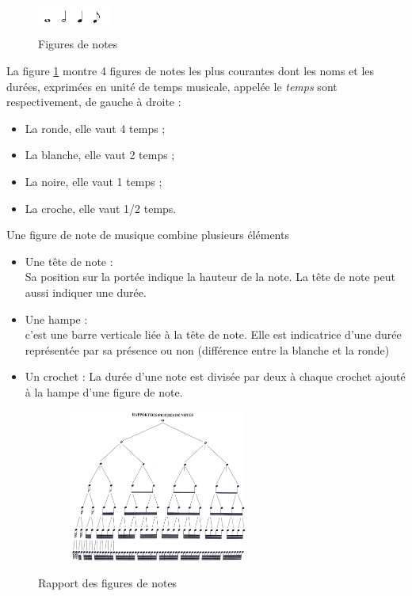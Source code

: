 \begin{figure}[h]
	\centering
	\includegraphics[height=10mm, width=25mm]{
    z_images/3_methodes/0_notation_de_la_batterie/0_figures_de_notes.png}
    \caption{Figures de notes}
    \label{4_notes}
\end{figure}
La figure \ref{4_notes} montre 4 figures de notes les plus courantes dont les
noms et les durées, exprimées en unité de temps musicale, appelée le
\emph{temps} sont respectivement, de gauche à droite :
\begin{itemize}
    \item La ronde, elle vaut 4 temps ;
    \item La blanche, elle vaut 2 temps ;
    \item La noire, elle vaut 1 temps ;
    \item La croche, elle vaut 1/2 temps.
\end{itemize}
Une figure de note \cite{danhauser} de musique combine plusieurs éléments
\cite{gould2016behind}
\begin{itemize}
	\item Une tête de note :\\
	Sa position sur la portée indique la hauteur de la note. La tête de note
    peut aussi indiquer une durée.
	\item Une hampe :\\
	c’est une barre verticale liée à la tête de note. Elle est indicatrice
    d’une durée représentée par sa présence ou non (différence entre la blanche
    et la ronde)
	\item Un crochet : La durée d’une note est divisée par deux à chaque
     crochet ajouté à la hampe d’une figure de note.\\
\end{itemize}
\begin{figure}[h]
	\centering
	\includegraphics[height=50mm, width=80mm]{
    z_images/3_methodes/0_notation_de_la_batterie/1_rapport_figures_notes.png}
	\caption{Rapport des figures de notes}\cite{danhauser}
	\label{rapp_fig_notes}
\end{figure}

